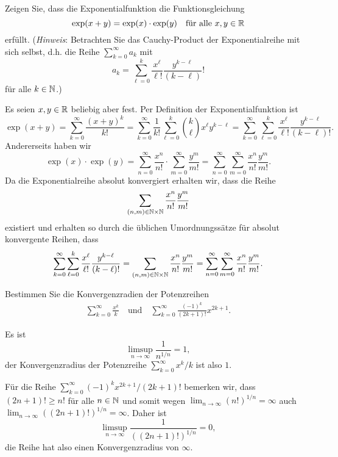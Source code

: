 \documentclass[a4paper,10pt]{article}
\begin{document}
\begin{question}
 Zeigen Sie, dass die Exponentialfunktion die Funktionsgleichung
 \[
  \exp(x+y) = \exp(x) \cdot \exp(y) \quad \text{für alle $x,y \in \mathbb{R}$}
 \]
 erfüllt. (\emph{Hinweis}: Betrachten Sie das Cauchy-Product der Exponentialreihe mit sich selbst, d.h. die Reihe $\sum_{k=0}^\infty a_k$ mit
 \[
  a_k = \sum_{\ell=0}^k \frac{x^\ell}{\ell!} \frac{y^{k-\ell}}{(k-\ell)}!
 \]
 für alle $k \in \mathbb{N}$.)
\end{question}
\begin{solution}
 Es seien $x,y \in \mathbb{R}$ beliebig aber fest. Per Definition der Exponentialfunktion ist
 \[
  \exp(x+y)
  = \sum_{k=0}^\infty \frac{(x+y)^k}{k!}
  = \sum_{k=0}^\infty \frac{1}{k!} \sum_{\ell=0}^k \binom{k}{\ell} x^\ell y^{k-\ell}
  = \sum_{k=0}^\infty \sum_{\ell=0}^k \frac{x^\ell}{\ell!} \frac{y^{k-\ell}}{(k-\ell)!}.
 \]
 Andererseits haben wir
 \[
  \exp(x) \cdot \exp(y)
  = \sum_{n=0}^\infty \frac{x^n}{n!} \cdot \sum_{m=0}^\infty \frac{y^m}{m!}
  = \sum_{n=0}^\infty \sum_{m=0}^\infty \frac{x^n}{n!} \frac{y^m}{m!}.
 \]
 Da die Exponentialreihe absolut konvergiert erhalten wir, dass die Reihe
 \[
  \sum_{(n,m) \in \mathbb{N} \times \mathbb{N}} \frac{x^n}{n!} \frac{y^m}{m!}
 \]
 existiert und erhalten so durch die üblichen Umordnungssätze für absolut konvergente Reihen, dass
 \[
  \sum_{k=0}^\infty \sum_{\ell=0}^k \frac{x^\ell}{\ell!} \frac{y^{k-\ell}}{(k-\ell)!}
  = \sum_{(n,m) \in \mathbb{N} \times \mathbb{N}} \frac{x^n}{n!} \frac{y^m}{m!}
  = \sum_{n=0}^\infty \sum_{m=0}^\infty \frac{x^n}{n!} \frac{y^m}{m!}.
 \]
\end{solution}


\begin{question}
 Bestimmen Sie die Konvergenzradien der Potenzreihen
 \begin{align*}
  \sum_{k=0}^\infty \frac{x^k}{k}
  \quad
  \text{und}
  \quad
  \sum_{k=0}^\infty \frac{(-1)^k}{(2k+1)!} x^{2k+1}.
 \end{align*}
\end{question}
\begin{solution}
 Es ist
 \[
  \limsup_{n \to \infty} \frac{1}{n^{1/n}} = 1,
 \]
 der Konvergenzradius der Potenzreihe $\sum_{k=0}^\infty x^k/k$ ist also $1$.
 
 Für die Reihe $\sum_{k=0}^\infty (-1)^k x^{2k+1}/(2k+1)!$ bemerken wir, dass $(2n+1)! \geq n!$ für alle $n \in \mathbb{N}$ und somit wegen $\lim_{n \to \infty} (n!)^{1/n} = \infty$ auch $\lim_{n \to \infty} ((2n+1)!)^{1/n} = \infty$. Daher ist
 \[
  \limsup_{n \to \infty} \frac{1}{((2n+1)!)^{1/n}}
  = 0,
 \]
 die Reihe hat also einen Konvergenzradius von $\infty$.
\end{solution}
\end{document}
